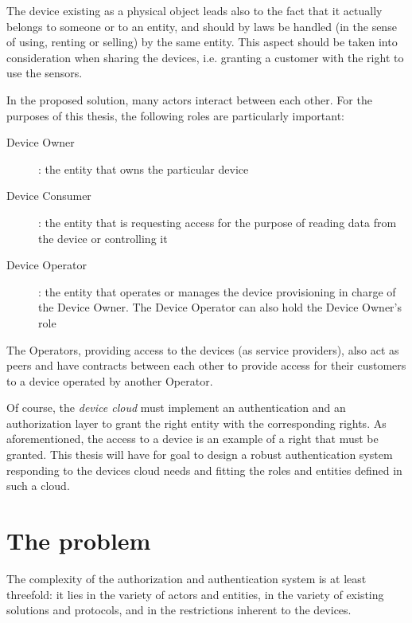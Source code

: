 The device existing as a physical object leads also to the fact that it actually belongs to someone or to an entity, and should by laws be handled (in the sense of using, renting or selling) by the same entity. This aspect should be taken into consideration when sharing the devices, i.e. granting a customer with the right to use the sensors.

In the proposed solution, many actors interact between each other. For the purposes of this thesis, the following roles are particularly important:

\begin{description}
	\item[Device Owner]: the entity that owns the particular device
	\item[Device Consumer]: the entity that is requesting access for the purpose of reading data from the device or controlling it
	\item[Device Operator]: the entity that operates or manages the device provisioning in charge of the Device Owner. The Device Operator can also hold the Device Owner's role
\end{description}

The Operators, providing access to the devices (as service providers), also act as peers and have contracts between each other to provide access for their customers to a device operated by another Operator.

Of course, the \emph{device cloud} must implement an authentication and an authorization layer to grant the right entity with the corresponding rights. As aforementioned, the access to a device is an example of a right that must be granted. This thesis will have for goal to design a robust authentication system responding to the devices cloud needs and fitting the roles and entities defined in such a cloud. 
\\

\section{The problem}
The complexity of the authorization and authentication system is at least threefold: it lies in the variety of actors and entities, in the variety of existing solutions and protocols, and in the restrictions inherent to the devices.

